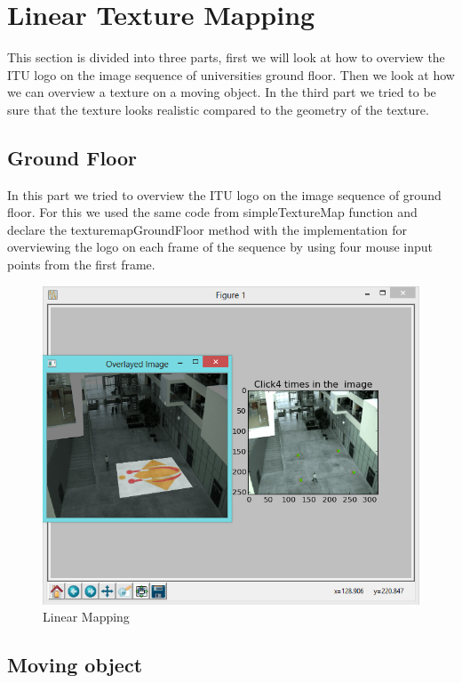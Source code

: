 \section{Linear Texture Mapping}

This section is divided into three parts, first we will look at how to overview the ITU logo on the image sequence of universities ground floor. Then we look at how we can overview a texture on a moving object. In the third part we tried to be sure that the texture looks realistic compared to the geometry of the texture.

\subsection{Ground Floor}

In this part we tried to overview the ITU logo on the image sequence of ground floor. For this we used the same code from simpleTextureMap function and declare the texturemapGroundFloor method with the implementation for overviewing the logo on each frame of the sequence by using four mouse input points from the first frame.

\begin{figure}[h!]
	\centering
	\includegraphics[width=\textwidth]{Handin2/images/linearmapping.jpg}
	\caption{Linear Mapping}
	\label{fig:linearmapping}
\end{figure}

\subsection{Moving object}

